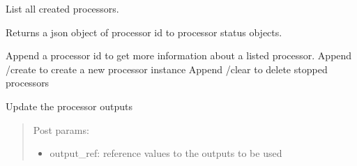 \documentclass[letterpaper,10pt,english]{sphinxmanual}
\begin{document}

\begin{fulllineitems}
\label{\detokenize{src.processors:src.processors.views.processor_list}}
List all created processors.

Returns a json object of processor id to processor status objects.

Append a processor id to get more information about a listed processor.
Append /create to create a new processor instance
Append /clear to delete stopped processors

\end{fulllineitems}


\begin{fulllineitems}
\label{\detokenize{src.processors:src.processors.views.processor_outputs_update}}
Update the processor outputs
\begin{quote}

Post params:
\begin{itemize}
\item {} 
output\_ref: reference values to the outputs to be used

\end{itemize}
\end{quote}

\end{fulllineitems}

\end{document}
